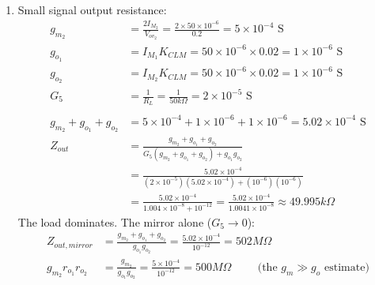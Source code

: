 \begin{enumerate}
    so the \(50\,k\Omega\) load keeps \(M_2\) saturated.
  \item Small signal output resistance:
    \begin{align*}
      g_{m_2} &= \frac{2 I_{M_2}}{V_{ov_2}} = \frac{2 \times 50 \times 10^{-6}}{0.2} = 5 \times 10^{-4} \text{ S} \\
      g_{o_1} &= I_{M_1} K_{CLM} = 50 \times 10^{-6} \times 0.02 = 1 \times 10^{-6} \text{ S} \\
      g_{o_2} &= I_{M_2} K_{CLM} = 50 \times 10^{-6} \times 0.02 = 1 \times 10^{-6} \text{ S} \\
      G_5 &= \frac{1}{R_L} = \frac{1}{50 k\Omega} = 2 \times 10^{-5} \text{ S} \\
      \\
      g_{m_2} + g_{o_1} + g_{o_2} &= 5 \times 10^{-4} + 1 \times 10^{-6} + 1 \times 10^{-6} = 5.02 \times 10^{-4} \text{ S} \\
      Z_{out} &= \frac{g_{m_2} + g_{o_1} + g_{o_2}}{G_{5}(g_{m_2} + g_{o_1} + g_{o_2}) + g_{o_1} g_{o_2}} \\
              &= \frac{5.02 \times 10^{-4}}{(2 \times 10^{-5})(5.02 \times 10^{-4}) + (10^{-6})(10^{-6})} \\
              &= \frac{5.02 \times 10^{-4}}{1.004 \times 10^{-8} + 10^{-12}} = \frac{5.02 \times 10^{-4}}{1.0041 \times 10^{-8}} \approx 49.995 k\Omega
    \end{align*}
    The load dominates. The mirror alone (\(G_5 \to 0\)):
    \begin{align*}
      Z_{out,mirror} &= \frac{g_{m_2} + g_{o_1} + g_{o_2}}{g_{o_1} g_{o_2}} = \frac{5.02 \times 10^{-4}}{10^{-12}} = 502 M\Omega \\
      g_{m_2} r_{o_1} r_{o_2} &= \frac{g_{m_2}}{g_{o_1} g_{o_2}} = \frac{5 \times 10^{-4}}{10^{-12}} = 500 M\Omega \hspace{1cm} \text{(the \(g_m \gg g_o\) estimate)}
    \end{align*}
\end{enumerate}

